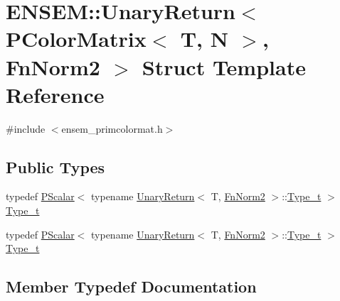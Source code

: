 \hypertarget{structENSEM_1_1UnaryReturn_3_01PColorMatrix_3_01T_00_01N_01_4_00_01FnNorm2_01_4}{}\section{E\+N\+S\+EM\+:\+:Unary\+Return$<$ P\+Color\+Matrix$<$ T, N $>$, Fn\+Norm2 $>$ Struct Template Reference}
\label{structENSEM_1_1UnaryReturn_3_01PColorMatrix_3_01T_00_01N_01_4_00_01FnNorm2_01_4}


{\ttfamily \#include $<$ensem\+\_\+primcolormat.\+h$>$}

\subsection*{Public Types}
\begin{DoxyCompactItemize}
\item 
typedef \mbox{\hyperlink{classENSEM_1_1PScalar}{P\+Scalar}}$<$ typename \mbox{\hyperlink{structENSEM_1_1UnaryReturn}{Unary\+Return}}$<$ T, \mbox{\hyperlink{structENSEM_1_1FnNorm2}{Fn\+Norm2}} $>$\+::\mbox{\hyperlink{structENSEM_1_1UnaryReturn_3_01PColorMatrix_3_01T_00_01N_01_4_00_01FnNorm2_01_4_ae6f0888acac23f20273fc635923e42cc}{Type\+\_\+t}} $>$ \mbox{\hyperlink{structENSEM_1_1UnaryReturn_3_01PColorMatrix_3_01T_00_01N_01_4_00_01FnNorm2_01_4_ae6f0888acac23f20273fc635923e42cc}{Type\+\_\+t}}
\item 
typedef \mbox{\hyperlink{classENSEM_1_1PScalar}{P\+Scalar}}$<$ typename \mbox{\hyperlink{structENSEM_1_1UnaryReturn}{Unary\+Return}}$<$ T, \mbox{\hyperlink{structENSEM_1_1FnNorm2}{Fn\+Norm2}} $>$\+::\mbox{\hyperlink{structENSEM_1_1UnaryReturn_3_01PColorMatrix_3_01T_00_01N_01_4_00_01FnNorm2_01_4_ae6f0888acac23f20273fc635923e42cc}{Type\+\_\+t}} $>$ \mbox{\hyperlink{structENSEM_1_1UnaryReturn_3_01PColorMatrix_3_01T_00_01N_01_4_00_01FnNorm2_01_4_ae6f0888acac23f20273fc635923e42cc}{Type\+\_\+t}}
\end{DoxyCompactItemize}


\subsection{Member Typedef Documentation}
\mbox{\label{structENSEM_1_1UnaryReturn_3_01PColorMatrix_3_01T_00_01N_01_4_00_01FnNorm2_01_4_ae6f0888acac23f20273fc635923e42cc}} 
